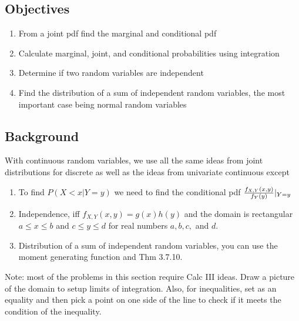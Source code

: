 \documentclass[]{book}
\providecommand{\tightlist}{%
  \setlength{\itemsep}{0pt}\setlength{\parskip}{0pt}}
\theoremstyle{definition}
\theoremstyle{definition}
\theoremstyle{definition}
\theoremstyle{remark}
\begin{document}
\subsection{Objectives}\label{objectives-16}

\begin{enumerate}
\def\labelenumi{\arabic{enumi}.}
\tightlist
\item
  From a joint pdf find the marginal and conditional pdf\\
\item
  Calculate marginal, joint, and conditional probabilities using
  integration\\
\item
  Determine if two random variables are independent\\
\item
  Find the distribution of a sum of independent random variables, the
  most important case being normal random variables
\end{enumerate}

\subsection{Background}\label{background-2}

With continuous random variables, we use all the same ideas from joint
distributions for discrete as well as the ideas from univariate
continuous except

\begin{enumerate}
\def\labelenumi{\arabic{enumi}.}
\tightlist
\item
  To find \(P(X<x|Y=y)\) we need to find the conditional pdf
  \({f_{X,Y}(x,y) \over f_{Y}(y)}|_{Y=y}\)\\
\item
  Independence, iff \(f_{X,Y}(x,y)=g(x)h(y)\) and the domain is
  rectangular \(a \leq x \leq b\) and \(c \leq y \leq d\) for real
  numbers \(a,b,c,\) and \(d\).\\
\item
  Distribution of a sum of independent random variables, you can use the
  moment generating function and Thm 3.7.10.
\end{enumerate}

Note: most of the problems in this section require Calc III ideas. Draw
a picture of the domain to setup limits of integration. Also, for
inequalities, set as an equality and then pick a point on one side of
the line to check if it meets the condition of the inequality.
\end{document}
